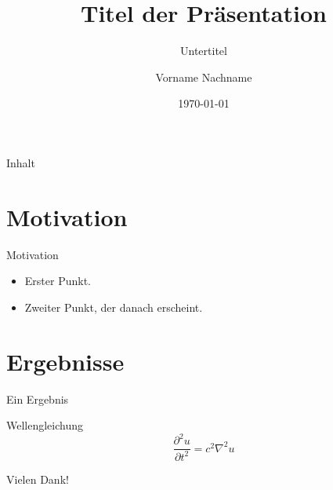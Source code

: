 \documentclass[aspectratio=169]{beamer}
\title{Titel der Präsentation}
\subtitle{Untertitel}
\author{Vorname Nachname}
\institute{Institution}
\date{\today}
\begin{document}
\begin{frame}
  \titlepage
\end{frame}

\begin{frame}{Inhalt}
  \tableofcontents
\end{frame}

\section{Motivation}

\begin{frame}{Motivation}
  \begin{itemize}
    \item<1-> Erster Punkt.
    \item<2-> Zweiter Punkt, der danach erscheint.
  \end{itemize}
\end{frame}

\section{Ergebnisse}

\begin{frame}{Ein Ergebnis}
  \begin{block}{Wellengleichung}
    \[
      \frac{\partial^2 u}{\partial t^2} = c^2 \nabla^2 u
    \]
  \end{block}
\end{frame}

\begin{frame}
  \centering\Large Vielen Dank!
\end{frame}
\end{document}
